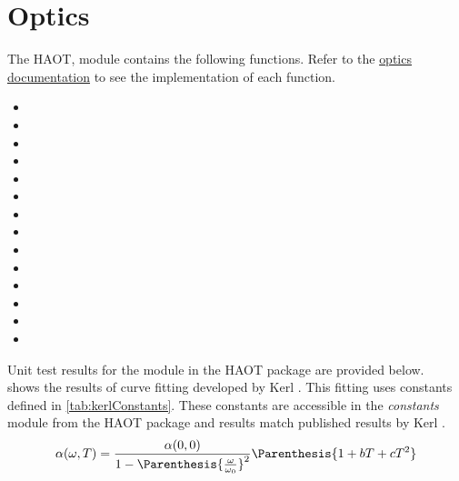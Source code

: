\section{Optics\label{ch4:optics}}
The \gls{HAOT},  module contains the following
functions. Refer to the
\href{https://haot.readthedocs.io/en/latest/modules/optics.html}{optics documentation}
to see the implementation of each function.
\begin{itemize}
    \item {}
    \item {}
    \item {}
    \item {}
    \item {}
    \item {}
    \item {}
    \item {}
    \item {}
    \item {}
    \item {}
    \item {}
    \item {}
    \item {}
\end{itemize}
Unit test results for the  module in the
\gls{HAOT} package are provided below. \\

     shows the results of curve fitting developed
    by Kerl \cite{Kerl1992}. This fitting uses constants defined in
    \cref{tab:kerlConstants}. These constants are accessible in the
    \textit{constants} module from the \gls{HAOT} package and results match
    published results by Kerl \cite{Kerl1992}.
    \begin{equation}\label{eq:kerlFitting}
        \alpha(\omega,T) = \frac{\alpha(0,0)}{1 -
        \Parenthesis{\frac{\omega}{\omega_0}}^2} \Parenthesis{1 + bT + cT^2}
    \end{equation}
    
